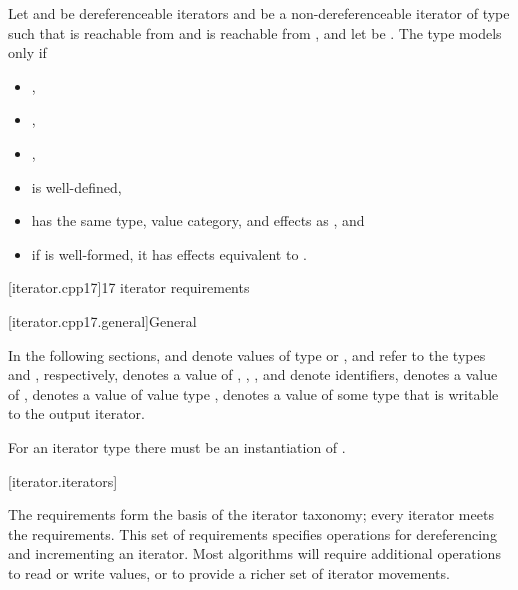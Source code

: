 \pnum
Let  and  be dereferenceable iterators and
 be a non-dereferenceable iterator of type 
such that  is reachable from  and
 is reachable from ,
and let  be .
The type  models  only if
\begin{itemize}
\item {},
\item {},
\item {},
\item {} is well-defined,
\item {} has
the same type, value category, and effects as , and
\item if  is well-formed,
it has effects equivalent to .
\end{itemize}

[iterator.cpp17]{\Cpp{}17 iterator requirements}

[iterator.cpp17.general]{General}

\pnum
In the following sections,
and
denote values of type
 or ,
 and  refer to the
types  and
, respectively,
denotes a value of
,
,
,
and
denote identifiers,
denotes a value of
,
denotes a value of value type
,
denotes a value of some type that is writable to the output iterator.
\begin{note}
For an iterator type  there must be an instantiation
of .
\end{note}

[iterator.iterators]{}

\pnum
The  requirements form the basis of the iterator
taxonomy; every iterator meets the  requirements. This
set of requirements specifies operations for dereferencing and incrementing
an iterator. Most algorithms will require additional operations to
read or write values, or
to provide a richer set of iterator movements.


